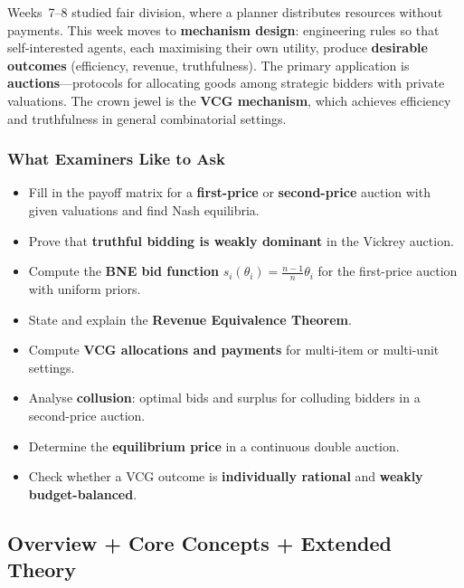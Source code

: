 Weeks~7--8 studied fair division, where a planner distributes resources without payments. This week moves to \textbf{mechanism design}: engineering rules so that self-interested agents, each maximising their own utility, produce \textbf{desirable outcomes} (efficiency, revenue, truthfulness). The primary application is \textbf{auctions}---protocols for allocating goods among strategic bidders with private valuations. The crown jewel is the \textbf{VCG mechanism}, which achieves efficiency and truthfulness in general combinatorial settings.

\separator

\subsubsection*{What Examiners Like to Ask}

\begin{itemize}
  \item Fill in the payoff matrix for a \textbf{first-price} or \textbf{second-price} auction with given valuations and find Nash equilibria.
  \item Prove that \textbf{truthful bidding is weakly dominant} in the Vickrey auction.
  \item Compute the \textbf{BNE bid function} $s_i(\theta_i) = \frac{n-1}{n}\theta_i$ for the first-price auction with uniform priors.
  \item State and explain the \textbf{Revenue Equivalence Theorem}.
  \item Compute \textbf{VCG allocations and payments} for multi-item or multi-unit settings.
  \item Analyse \textbf{collusion}: optimal bids and surplus for colluding bidders in a second-price auction.
  \item Determine the \textbf{equilibrium price} in a continuous double auction.
  \item Check whether a VCG outcome is \textbf{individually rational} and \textbf{weakly budget-balanced}.
\end{itemize}

\separator

\subsection{Overview + Core Concepts + Extended Theory}

